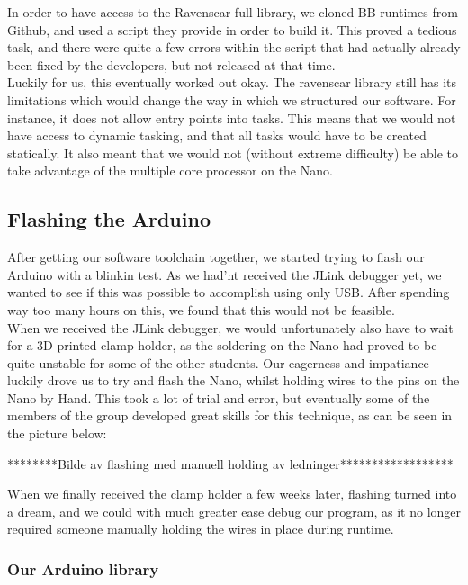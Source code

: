 \documentclass{article}
\begin{document}
In order to have access to the Ravenscar full library, we cloned BB-runtimes from Github, and used a script they provide in order to build it. This proved a tedious task, and there were quite a few errors within the script that had actually already been fixed by the developers, but not released at that time.\\
Luckily for us, this eventually worked out okay. The ravenscar library still has its limitations which would change the way in which we structured our software. For instance, it does not allow entry points into tasks. This means that we would not have access to dynamic tasking, and that all tasks would have to be created statically. It also meant that we would not (without extreme difficulty) be able to take advantage of the multiple core processor on the Nano.\\

\subsection{Flashing the Arduino}

After getting our software toolchain together, we started trying to flash our Arduino with a blinkin test. As we had'nt received the JLink debugger yet, we wanted to see if this was possible to accomplish using only USB. After spending way too many hours on this, we found that this would not be feasible.\\

When we received the JLink debugger, we would unfortunately also have to wait for a 3D-printed clamp holder, as the soldering on the Nano had proved to be quite unstable for some of the other students. Our eagerness and impatiance luckily drove us to try and flash the Nano, whilst holding wires to the pins on the Nano by Hand. This took a lot of trial and error, but eventually some of the members of the group developed great skills for this technique, as can be seen in the picture below:

********Bilde av flashing med manuell holding av ledninger******************

When we finally received the clamp holder a few weeks later, flashing turned into a dream, and we could with much greater ease debug our program, as it no longer required someone manually holding the wires in place during runtime.


\subsubsection{Our Arduino library}
\end{document}
